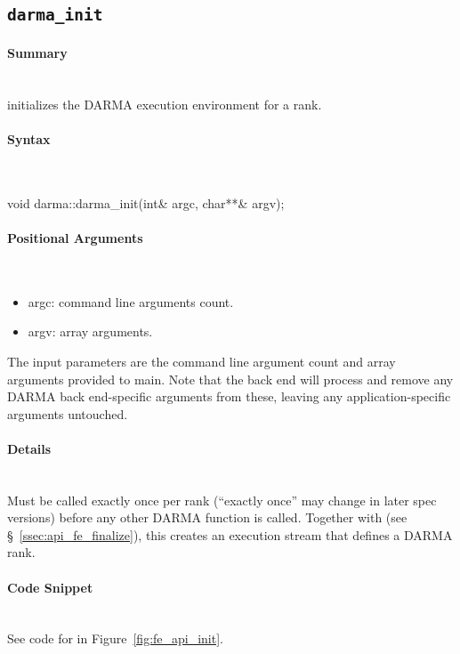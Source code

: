 
\subsection{\texttt{darma\_init}}
\label{subsec:darma_init}

\paragraph{Summary}\mbox{}\\
 initializes the \gls{DARMA} execution environment for a \gls{rank}.

\paragraph{Syntax}\mbox{}\\
\begin{CppCode}
void darma::darma_init(int& argc, char**& argv);
\end{CppCode}

\paragraph{Positional Arguments}\mbox{}\\
\begin{itemize}
\item argc: command line arguments count.
\item argv: array arguments.
\end{itemize}
The input parameters are the command line argument count 
and array arguments provided to main.  
Note that the back end will process and remove 
any \gls{DARMA} \gls{back end}-specific arguments from these, leaving any
application-specific arguments untouched.


\paragraph{Details}\mbox{}\\
Must be called exactly once per \gls{rank} (``exactly once'' may change in later
spec versions) before any other \gls{DARMA} function is called.
Together with  (see \S~\ref{ssec:api_fe_finalize}),
this creates an \gls{execution stream} that defines a \gls{DARMA} \gls{rank}.

\paragraph{Code Snippet}\mbox{}\\ 
See code for  in Figure~\ref{fig:fe_api_init}.

